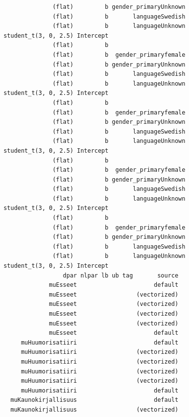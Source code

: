 \documentclass[
  letterpaper,
  DIV=11,
  numbers=noendperiod]{scrartcl}
\begin{document}
\begin{verbatim}
               (flat)         b gender_primaryUnknown           
               (flat)         b       languageSwedish           
               (flat)         b       languageUnknown           
 student_t(3, 0, 2.5) Intercept                                 
               (flat)         b                                 
               (flat)         b  gender_primaryfemale           
               (flat)         b gender_primaryUnknown           
               (flat)         b       languageSwedish           
               (flat)         b       languageUnknown           
 student_t(3, 0, 2.5) Intercept                                 
               (flat)         b                                 
               (flat)         b  gender_primaryfemale           
               (flat)         b gender_primaryUnknown           
               (flat)         b       languageSwedish           
               (flat)         b       languageUnknown           
 student_t(3, 0, 2.5) Intercept                                 
               (flat)         b                                 
               (flat)         b  gender_primaryfemale           
               (flat)         b gender_primaryUnknown           
               (flat)         b       languageSwedish           
               (flat)         b       languageUnknown           
 student_t(3, 0, 2.5) Intercept                                 
               (flat)         b                                 
               (flat)         b  gender_primaryfemale           
               (flat)         b gender_primaryUnknown           
               (flat)         b       languageSwedish           
               (flat)         b       languageUnknown           
 student_t(3, 0, 2.5) Intercept                                 
                  dpar nlpar lb ub tag       source
              muEsseet                      default
              muEsseet                 (vectorized)
              muEsseet                 (vectorized)
              muEsseet                 (vectorized)
              muEsseet                 (vectorized)
              muEsseet                      default
      muHuumorisatiiri                      default
      muHuumorisatiiri                 (vectorized)
      muHuumorisatiiri                 (vectorized)
      muHuumorisatiiri                 (vectorized)
      muHuumorisatiiri                 (vectorized)
      muHuumorisatiiri                      default
   muKaunokirjallisuus                      default
   muKaunokirjallisuus                 (vectorized)

\end{verbatim}
\end{document}
